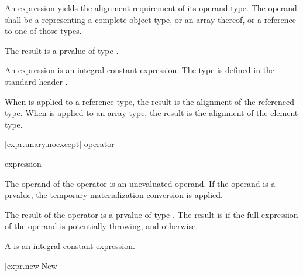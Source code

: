 \pnum
{}%
%
An  expression yields the alignment requirement
of its operand type. The operand shall be a 
representing a complete object type, or an array thereof, or a reference
to one of those types.

\pnum
The result is a prvalue of type .
\begin{note}
An  expression
is an integral constant expression.
The type  is defined in the standard header
.
\end{note}

\pnum
When  is applied to a reference type, the result
is the alignment of the referenced type. When 
is applied to an array type, the result is the alignment of the
element type.

[expr.unary.noexcept]{ operator}

%
%

\begin{bnf}
\br
   \terminal{(} expression \terminal{)}
\end{bnf}

\pnum
The operand of the  operator
is an unevaluated operand.
If the operand is a prvalue,
the temporary materialization conversion is applied.

\pnum
The result of the  operator is a prvalue of type .
The result is  if
the full-expression of the operand is potentially-throwing, and
 otherwise.
\begin{note}
A 
is an integral constant expression.
\end{note}

[expr.new]{New}

